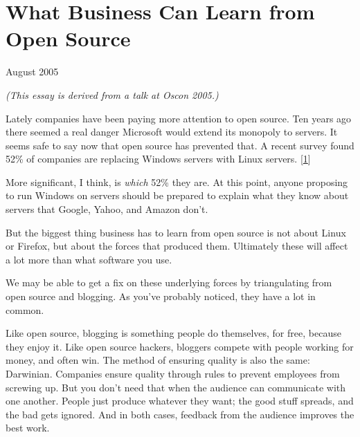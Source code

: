 \chapter{What Business Can Learn from Open Source}


            
              
                

August 2005

\emph{(This essay is derived from a talk at Oscon 2005.)}

Lately companies have been paying more attention
                  to open source. Ten years ago there seemed a real danger
                  Microsoft would extend its monopoly to servers. It seems safe
                  to say now that open source has prevented that. A recent
                  survey found 52\% of companies are replacing Windows servers
                  with Linux servers.
                  [\href{\#f1n}{1}]

More significant, I think, is \emph{which} 52\%
                  they are. At this point, anyone proposing to run Windows on
                  servers should be prepared to explain what they know about
                  servers that Google, Yahoo, and Amazon don't.

But
                  the biggest thing business has to learn from open source is
                  not about Linux or Firefox, but about the forces that produced
                  them. Ultimately these will affect a lot more than what
                  software you use.

We may be able to get a fix on
                  these underlying forces by triangulating from open source and
                  blogging. As you've probably noticed, they have a lot in
                  common.

Like open source, blogging is something
                  people do themselves, for free, because they enjoy it. Like
                  open source hackers, bloggers compete with people working for
                  money, and often win. The method of ensuring quality is also
                  the same: Darwinian. Companies ensure quality through rules to
                  prevent employees from screwing up. But you don't need that
                  when the audience can communicate with one another. People
                  just produce whatever they want; the good stuff spreads, and
                  the bad gets ignored. And in both cases, feedback from the
                  audience improves the best work.

